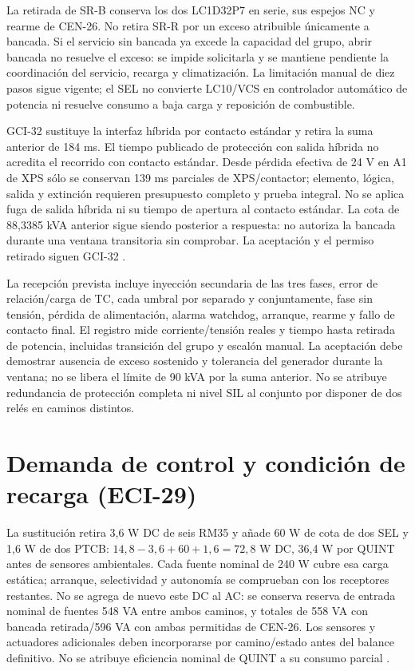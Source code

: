 La retirada de SR-B conserva los dos LC1D32P7 en serie, sus espejos NC y rearme de CEN-26. No retira SR-R por un exceso atribuible únicamente a bancada. Si el servicio sin bancada ya excede la capacidad del grupo, abrir bancada no resuelve el exceso: se impide solicitarla y se mantiene pendiente la coordinación del servicio, recarga y climatización. La limitación manual de diez pasos sigue vigente; el SEL no convierte LC10/VCS en controlador automático de potencia ni resuelve consumo a baja carga y reposición de combustible.

GCI-32 sustituye la interfaz híbrida por contacto estándar y retira la suma anterior de 184 ms. El tiempo publicado de protección con salida híbrida no acredita el recorrido con contacto estándar. Desde pérdida efectiva de 24 V en A1 de XPS sólo se conservan 139 ms parciales de XPS/contactor; elemento, lógica, salida y extinción requieren presupuesto completo y prueba integral. No se aplica fuga de salida híbrida ni su tiempo de apertura al contacto estándar. La cota de 88,3385 kVA anterior sigue siendo posterior a respuesta: no autoriza la bancada durante una ventana transitoria sin comprobar. La aceptación y el permiso retirado siguen GCI-32 \parencites{lote32-selmanual2024}{lote29-sel751}{lote26-xpsmanual}{lote26-contactor}.

La recepción prevista incluye inyección secundaria de las tres fases, error de relación/carga de TC, cada umbral por separado y conjuntamente, fase sin tensión, pérdida de alimentación, alarma watchdog, arranque, rearme y fallo de contacto final. El registro mide corriente/tensión reales y tiempo hasta retirada de potencia, incluidas transición del grupo y escalón manual. La aceptación debe demostrar ausencia de exceso sostenido y tolerancia del generador durante la ventana; no se libera el límite de 90 kVA por la suma anterior. No se atribuye redundancia de protección completa ni nivel SIL al conjunto por disponer de dos relés en caminos distintos.

\section{Demanda de control y condición de recarga (ECI-29)}
\label{sec:sd4-control-eci29}

La sustitución retira 3,6 W DC de seis RM35 y añade 60 W de cota de dos SEL y 1,6 W de dos PTCB: $14,8-3,6+60+1,6=72,8$ W DC, 36,4 W por QUINT antes de sensores ambientales. Cada fuente nominal de 240 W cubre esa carga estática; arranque, selectividad y autonomía se comprueban con los receptores restantes. No se agrega de nuevo este DC al AC: se conserva reserva de entrada nominal de fuentes 548 VA entre ambos caminos, y totales de 558 VA con bancada retirada/596 VA con ambas permitidas de CEN-26. Los sensores y actuadores adicionales deben incorporarse por camino/estado antes del balance definitivo. No se atribuye eficiencia nominal de QUINT a su consumo parcial \parencites[p.~34]{lote29-sel751}{lote29-ptcb2}[pp.~3--4]{p6-puestos-quint}.

